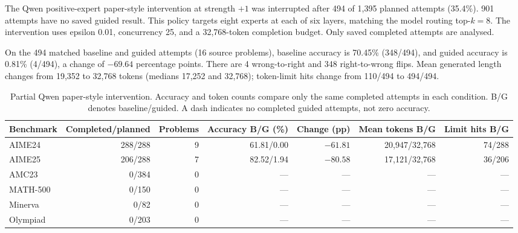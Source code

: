 \documentclass[12pt,a4paper,twoside,openright]{book}
\begin{document}
\label{sec:partial-qwen-paper}

The Qwen positive-expert paper-style intervention at strength $+1$ was interrupted after 494 of 1,395 planned attempts (35.4\%). 901 attempts have no saved guided result. This policy targets eight experts at each of six layers, matching the model routing top-$k=8$. The intervention uses epsilon 0.01, concurrency 25, and a 32,768-token completion budget. Only saved completed attempts are analysed.

On the 494 matched baseline and guided attempts (16 source problems), baseline accuracy is 70.45\% (348/494), and guided accuracy is 0.81\% (4/494), a change of $-69.64$ percentage points. There are 4 wrong-to-right and 348 right-to-wrong flips. Mean generated length changes from 19,352 to 32,768 tokens (medians 17,252 and 32,768); token-limit hits change from 110/494 to 494/494.

\begin{table}[!ht]\centering\small

\caption{Partial Qwen paper-style intervention. Accuracy and token counts compare only the same completed attempts in each condition. B/G denotes baseline/guided. A dash indicates no completed guided attempts, not zero accuracy.}

\label{tab:partial-qwen-paper}

\begin{adjustbox}{max width=\linewidth}\begin{tabular}{lrrrrrr}\toprule

Benchmark & Completed/planned & Problems & Accuracy B/G (\%) & Change (pp) & Mean tokens B/G & Limit hits B/G \\\midrule

AIME24 & 288/288 & 9 & 61.81/0.00 & $-61.81$ & 20,947/32,768 & 74/288 \\

AIME25 & 206/288 & 7 & 82.52/1.94 & $-80.58$ & 17,121/32,768 & 36/206 \\

AMC23 & 0/384 & 0 & --- & --- & --- & --- \\

MATH-500 & 0/150 & 0 & --- & --- & --- & --- \\

Minerva & 0/82 & 0 & --- & --- & --- & --- \\

Olympiad & 0/203 & 0 & --- & --- & --- & --- \\

\bottomrule\end{tabular}
\end{adjustbox}\end{table}
\end{document}
